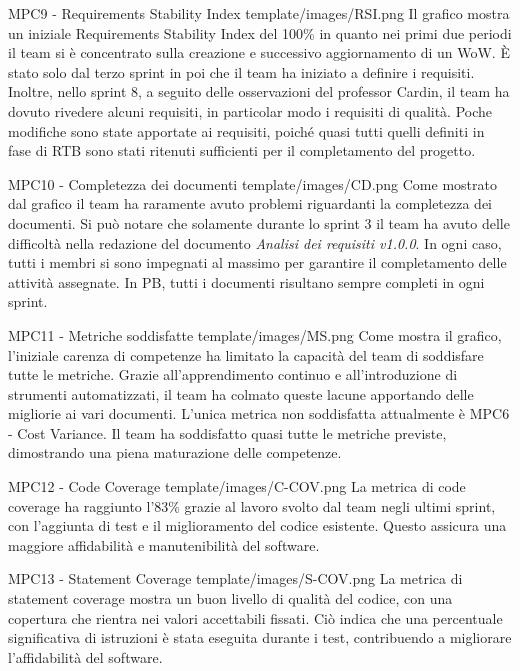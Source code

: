\Met
{ %
    MPC9 - Requirements Stability Index
}
{ %
    template/images/RSI.png
}
{ %
    Il grafico mostra un iniziale Requirements Stability Index del 100\% in quanto nei primi due periodi il team si è
    concentrato sulla creazione e successivo aggiornamento di un WoW. 
    È stato solo dal terzo sprint in poi che il team ha iniziato a definire i requisiti.
    Inoltre, nello sprint 8, a seguito delle osservazioni del professor Cardin, il team ha dovuto rivedere alcuni requisiti,
    in particolar modo i requisiti di qualità.
}
{ %
    Poche modifiche sono state apportate ai requisiti, poiché quasi tutti quelli definiti in fase di RTB sono stati ritenuti sufficienti per il completamento del progetto.
}

\Met
{ %
    MPC10 - Completezza dei documenti
}
{ %
    template/images/CD.png
}
{ %
    Come mostrato dal grafico il team ha raramente avuto problemi riguardanti la completezza dei documenti.
    Si può notare che solamente durante lo sprint 3 il team ha avuto delle difficoltà nella redazione del documento \textit{Analisi dei requisiti v1.0.0}.
    In ogni caso, tutti i membri si sono impegnati al massimo per garantire il completamento delle attività assegnate.
}
{ %
    In PB, tutti i documenti risultano sempre completi in ogni sprint.
}

\Met
{ %
    MPC11 - Metriche soddisfatte
}
{ %
    template/images/MS.png
}
{ %
    Come mostra il grafico, l'iniziale carenza di competenze ha limitato la capacità del team di soddisfare tutte le metriche.
    Grazie all'apprendimento continuo e all'introduzione di strumenti automatizzati, il team ha colmato queste lacune apportando delle migliorie ai vari documenti.
    L'unica metrica non soddisfatta attualmente è MPC6 - Cost Variance.
}
{ %
    Il team ha soddisfatto quasi tutte le metriche previste, dimostrando una piena maturazione delle competenze.
}

\MetNoPB
{ %
    MPC12 - Code Coverage
}
{ %
    template/images/C-COV.png
}
{ %
La metrica di code coverage ha raggiunto l'83\% grazie al lavoro svolto dal team negli ultimi sprint, con l’aggiunta di test e il miglioramento del codice esistente. Questo assicura una maggiore affidabilità e manutenibilità del software.
}


\MetNoPB
{ %
    MPC13 - Statement Coverage
}
{ %
    template/images/S-COV.png
}
{ %
    La metrica di statement coverage mostra un buon livello di qualità del codice, con una copertura che rientra nei valori accettabili fissati. Ciò indica che una percentuale significativa di istruzioni è stata eseguita durante i test, contribuendo a migliorare l'affidabilità del software.
}


